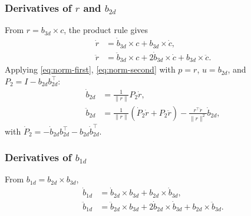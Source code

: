 \documentclass[11pt]{article}
\theoremstyle{remark}
\begin{document}
\subsubsection{Derivatives of $r$ and $b_{2d}$}
From $r = b_{3d}\times c$, the product rule gives
\begin{align}
\dot r &= \dot b_{3d}\times c + b_{3d}\times \dot c,\\
\ddot r &= \ddot b_{3d}\times c + 2\dot b_{3d}\times\dot c + b_{3d}\times\ddot c.
\end{align}
Applying \eqref{eq:norm-first}, \eqref{eq:norm-second} with $p = r$, $u = b_{2d}$, and $P_2 = I - b_{2d}b_{2d}^\top$:
\begin{align}
\dot b_{2d} &= \tfrac{1}{\|r\|}P_2\dot r,\label{eq:b2d-dot}\\
\ddot b_{2d} &= \tfrac{1}{\|r\|}(\dot P_2\dot r + P_2\ddot r) - \tfrac{r^\top\dot r}{\|r\|^2}\dot b_{2d},\label{eq:b2d-ddot}
\end{align}
with $\dot P_2 = -\dot b_{2d}b_{2d}^\top - b_{2d}\dot b_{2d}^\top$.

\subsubsection{Derivatives of $b_{1d}$}
From $b_{1d} = b_{2d}\times b_{3d}$,
\begin{align}
\dot b_{1d} &= \dot b_{2d}\times b_{3d} + b_{2d}\times\dot b_{3d},\label{eq:b1d-dot}\\
\ddot b_{1d} &= \ddot b_{2d}\times b_{3d} + 2\dot b_{2d}\times\dot b_{3d} + b_{2d}\times\ddot b_{3d}.\label{eq:b1d-ddot}
\end{align}
\end{document}
